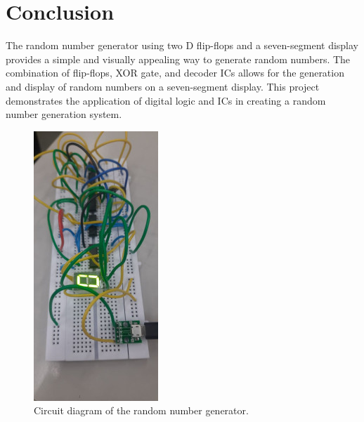 \documentclass[journal,12pt,twocolumn]{IEEEtran}
\begin{document}
 


\section{Conclusion}
The random number generator using two D flip-flops and a seven-segment display provides a simple and visually appealing way to generate random numbers. The combination of flip-flops, XOR gate, and decoder ICs allows for the generation and display of random numbers on a seven-segment display. This project demonstrates the application of digital logic and ICs in creating a random number generation system.


\begin{figure}[H]
   \centering
   \includegraphics{cir.jpg}
   \caption{Circuit diagram of the random number generator.}
   \label{fig:circuit}
\end{figure}
\end{document}
